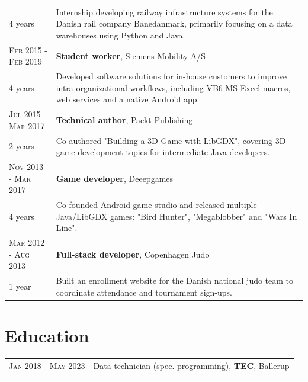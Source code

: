 \documentclass[a4paper,10pt]{article}
\begin{document}
\begin{tabular}{@{}p{3.4cm}p{12.9cm}@{}}
	\footnotesize{4 years}       & \footnotesize{Internship developing railway infrastructure systems for the Danish rail company Banedanmark, primarily focusing on a data warehouses using Python and Java.}         \\[5pt]
	\textsc{Feb 2015 - Feb 2019} & \textbf{Student worker}, Siemens Mobility A/S                                                                                                                                       \\
	\footnotesize{4 years}       & \footnotesize{Developed software solutions for in-house customers to improve intra-organizational workflows, including VB6 MS Excel macros, web services and a native Android app.} \\[5pt]
	\textsc{Jul 2015 - Mar 2017} & \textbf{Technical author}, Packt Publishing                                                                                                                                         \\
	\footnotesize{2 years}       & \footnotesize{Co-authored "Building a 3D Game with LibGDX", covering 3D game development topics for intermediate Java developers.}                                                  \\[5pt]
	\textsc{Nov 2013 - Mar 2017} & \textbf{Game developer}, Deeepgames                                                                                                                                                 \\
	\footnotesize{4 years}       & \footnotesize{Co-founded Android game studio and released multiple Java/LibGDX games: "Bird Hunter", "Megablobber" and "Wars In Line".}                                             \\[5pt]
	\textsc{Mar 2012 - Aug 2013} & \textbf{Full-stack developer}, Copenhagen Judo                                                                                                                                      \\
	\footnotesize{1 year}        & \footnotesize{Built an enrollment website for the Danish national judo team to coordinate attendance and tournament sign-ups.}                                                      \\
\end{tabular}

\section{Education}
\begin{tabular}{rl}
	\textsc{Jan 2018 - May 2023} & Data technician (spec. programming), \textbf{TEC}, Ballerup \\ & \\
\end{tabular}
\end{document}
